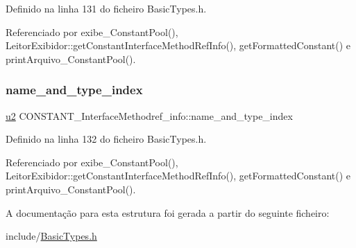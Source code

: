 Definido na linha 131 do ficheiro Basic\+Types.\+h.



Referenciado por exibe\+\_\+\+Constant\+Pool(), Leitor\+Exibidor\+::get\+Constant\+Interface\+Method\+Ref\+Info(), get\+Formatted\+Constant() e print\+Arquivo\+\_\+\+Constant\+Pool().

\mbox{\label{structCONSTANT__InterfaceMethodref__info_aeeb0a97e077fcbd839a67d7bb3ac6d5b}} 
\subsubsection{\texorpdfstring{name\+\_\+and\+\_\+type\+\_\+index}{name\_and\_type\_index}}
{\footnotesize\ttfamily \hyperlink{BasicTypes_8h_a732cde1300aafb73b0ea6c2558a7a54f}{u2} C\+O\+N\+S\+T\+A\+N\+T\+\_\+\+Interface\+Methodref\+\_\+info\+::name\+\_\+and\+\_\+type\+\_\+index}



Definido na linha 132 do ficheiro Basic\+Types.\+h.



Referenciado por exibe\+\_\+\+Constant\+Pool(), Leitor\+Exibidor\+::get\+Constant\+Interface\+Method\+Ref\+Info(), get\+Formatted\+Constant() e print\+Arquivo\+\_\+\+Constant\+Pool().



A documentação para esta estrutura foi gerada a partir do seguinte ficheiro\+:\begin{DoxyCompactItemize}
\item 
include/\hyperlink{BasicTypes_8h}{Basic\+Types.\+h}\end{DoxyCompactItemize}
